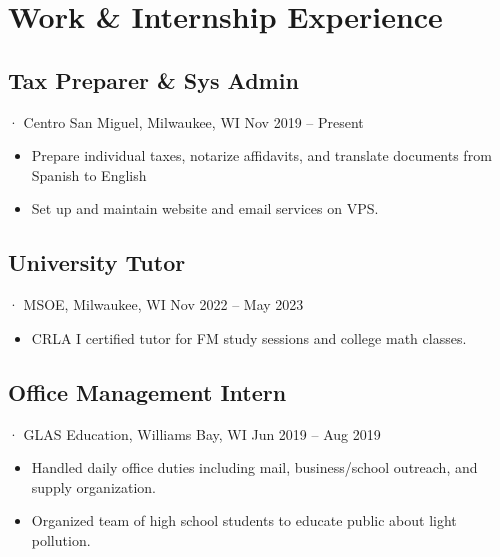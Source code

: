 \documentclass[12pt]{article}
\newcommand{\itemspace}{\vspace{0.1870em}}
\begin{document}
\section{Work \& Internship Experience}

\subsection{Tax Preparer \& Sys Admin}
· Centro San Miguel, Milwaukee, WI \hfill Nov 2019 -- Present

\begin{itemize}[noitemsep,nolistsep]
  \item Prepare individual taxes, notarize affidavits, and translate documents
    from Spanish to English

  \item Set up and maintain website and email services on VPS.
\end{itemize}

\itemspace

\subsection{University Tutor}
· MSOE, Milwaukee, WI \hfill Nov 2022 -- May 2023

\begin{itemize}[noitemsep,nolistsep]
  \item CRLA I certified tutor for FM study sessions and college math classes.
\end{itemize}

\itemspace

\subsection{Office Management Intern}
· GLAS Education, Williams Bay, WI  \hfill Jun 2019 -- Aug 2019

\begin{itemize}[noitemsep,nolistsep]
  \item Handled daily office duties including mail, business/school outreach,
    and supply organization.

  \item Organized team of high school students to educate public about light
    pollution.
\end{itemize}
\end{document}
